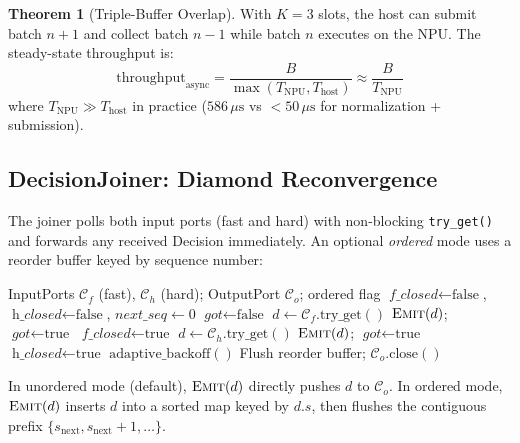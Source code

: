 \documentclass[11pt,a4paper,twoside]{article}
\theoremstyle{definition}
\newtheorem{theorem}{Theorem}[section]
\theoremstyle{remark}
\begin{document}
\begin{theorem}[Triple-Buffer Overlap]
\label{thm:triple-buffer}
With $K = 3$ slots, the host can submit batch $n+1$ and collect batch $n-1$ while batch $n$ executes on the NPU. The steady-state throughput is:
\begin{equation}
\text{throughput}_{\text{async}} = \frac{B}{\max(T_{\text{NPU}}, T_{\text{host}})} \approx \frac{B}{T_{\text{NPU}}}
\end{equation}
where $T_{\text{NPU}} \gg T_{\text{host}}$ in practice (${586}\,\mu\text{s}$ vs ${<}50\,\mu\text{s}$ for normalization + submission).
\end{theorem}

\subsection{DecisionJoiner: Diamond Reconvergence}

The joiner polls both input ports (fast and hard) with non-blocking \texttt{try\_get()} and forwards any received Decision immediately. An optional \emph{ordered} mode uses a reorder buffer keyed by sequence number:

\begin{algorithm}[H]
\caption{\textsc{DecisionJoiner}: merge fast and hard paths}
\label{alg:joiner}
\begin{algorithmic}[1]
\Require InputPorts $\mathcal{C}_f$ (fast), $\mathcal{C}_h$ (hard); OutputPort $\mathcal{C}_o$; ordered flag
\State $\textit{f\_closed} \gets \text{false}$, $\textit{h\_closed} \gets \text{false}$, $\textit{next\_seq} \gets 0$
  \State $\textit{got} \gets \text{false}$
    \State $d \gets \mathcal{C}_f.\text{try\_get}()$
     $\textsc{Emit}(d)$; $\textit{got} \gets \text{true}$
     $\textit{f\_closed} \gets \text{true}$
    \EndIf
  \EndIf
    \State $d \gets \mathcal{C}_h.\text{try\_get}()$
     $\textsc{Emit}(d)$; $\textit{got} \gets \text{true}$
     $\textit{h\_closed} \gets \text{true}$
    \EndIf
  \EndIf
   $\text{adaptive\_backoff}()$ \EndIf
\EndWhile
\State Flush reorder buffer; $\mathcal{C}_o.\text{close}()$
\end{algorithmic}
\end{algorithm}

In unordered mode (default), $\textsc{Emit}(d)$ directly pushes $d$ to $\mathcal{C}_o$. In ordered mode, $\textsc{Emit}(d)$ inserts $d$ into a sorted map keyed by $d.s$, then flushes the contiguous prefix $\{s_{\text{next}}, s_{\text{next}}+1, \ldots\}$.
\end{document}
